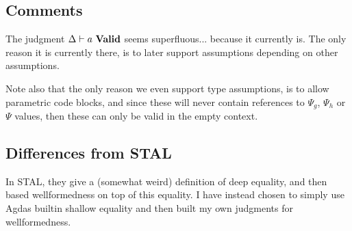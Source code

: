 
\fbox{$\valid{}{\Psi}$}
\begin{mathpar}
\end{mathpar}


\subsection{Comments}
The judgment $\valid{\Delta}{a}$ seems superfluous... because it currently
is. The only reason it is currently there, is to later support assumptions
depending on other assumptions.

Note also that the only reason we even support type assumptions, is to allow
parametric code blocks, and since these will never contain references to
$\Psi_g$, $\Psi_h$ or $\Psi$ values, then these can only be valid in the empty
context.

\subsection{Differences from STAL}

In STAL, they give a (somewhat weird) definition of deep equality, and then
based wellformedness on top of this equality. I have instead chosen to simply
use Agdas builtin shallow equality and then built my own judgments for
wellformedness.
